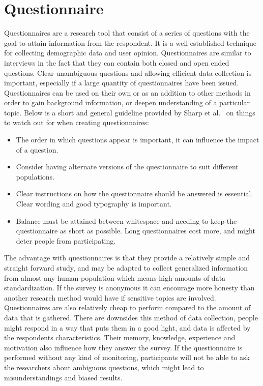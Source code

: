 \section{Questionnaire}
Questionnaires are a research tool that consist of a series of questions with the goal to attain information from the respondent. It is a well established technique for collecting demographic data and user opinion. Questionnaires are similar to interviews in the fact that they can contain both closed and open ended questions. Clear unambiguous questions and allowing efficient data collection is important, especially if a large quantity of questionnaires have been issued. Questionnaires can be used on their own or as an addition to other methods in order to gain background information, or deepen understanding of a particular topic. Below is a short and general guideline provided by Sharp et al.~\cite{interactionDesign} on things to watch out for when creating questionnaires:

\begin{itemize}[itemsep=3pt,parsep=0pt]
  \item The order in which questions appear is important, it can influence the impact of a question.
  \item Consider having alternate versions of the questionnaire to suit different populations.
  \item Clear instructions on how the questionnaire should be answered is essential. Clear wording and good typography is important.
  \item Balance must be attained between whitespace and needing to keep the questionnaire as short as possible. Long questionnaires cost more, and might deter people from participating.
\end{itemize}

The advantage with questionnaires is that they provide a relatively simple and straight forward study, and may be adapted to collect generalized information from almost any human population which means high amounts of data standardization. If the survey is anonymous it can encourage more honesty than another research method would have if sensitive topics are involved. Questionnaires are also relatively cheap to perform compared to the amount of data that is gathered. There are downsides this method of data collection, people might respond in a way that puts them in a good light, and data is affected by the respondents characteristics. Their memory, knowledge, experience and motivation also influence how they answer the survey. If the questionnaire is performed without any kind of monitoring, participants will not be able to ask the researchers about ambiguous questions, which might lead to misunderstandings and biased results.

